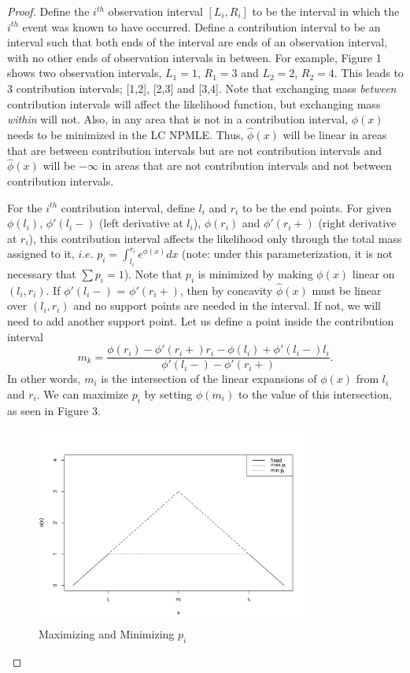 	\begin{proof}

	Define the $i^{th}$ observation interval $[L_i, R_i]$ to be the interval in which the $i^{th}$ event was known to have occurred. Define a contribution interval to be an interval such that both ends of the interval are ends of an observation interval, with no other ends of observation intervals in between. For example, Figure 1 shows two observation intervals, $L_1 = 1$, $R_1 = 3$ and $L_2 = 2$, $R_2 = 4$. This leads to 3 contribution intervals; [1,2], [2,3] and [3,4]. Note that exchanging mass \emph{between} contribution intervals will affect the likelihood function, but exchanging mass \emph{within} will not. Also, in any area that is not in a contribution interval, $\phi(x)$ needs to be minimized in the LC NPMLE. Thus, $\hat \phi(x)$ will be linear in areas that are between contribution intervals but are not contribution intervals and $\hat \phi(x)$ will be $-\infty$ in areas that are not contribution intervals and not between contribution intervals. 

	For the $i^{th}$ contribution interval, define $l_i$ and $r_i$ to be the end points. For given $\phi(l_i)$, $\phi'(l_i -)$ (left derivative at $l_i$), $\phi(r_i)$ and $\phi'(r_i+)$ (right derivative at $r_i$), this contribution interval affects the likelihood only through the total mass assigned to it, $i.e.$ $p_i = \int_{l_i}^{r_i} e^ {\phi(x)} dx$ (note: under this parameterization, it is not necessary that $\sum p_i = 1$). Note that $p_i$ is minimized by making $\phi(x)$ linear on $(l_i, r_i)$. If $\phi'(l_i - )$ = $\phi'(r_i + )$, then by concavity $\hat{\phi}(x)$ must be linear over $(l_i, r_i)$ and no support points are needed in the interval. If not, we will need to add another support point. Let us define a point inside the contribution interval 	
	\[ m_k = \frac{\phi(r_i) - \phi'(r_i + ) r_i - \phi(l_i) + \phi'(l_i - ) l_i} { \phi'(l_i - ) - \phi'(r_i + )}.
	\]		
	In other words, $m_i$ is the intersection of the linear expansions of $\phi(x)$ from $l_i$ and $r_i$. We can maximize $p_i$ by setting $\phi(m_i)$ to the value of this intersection, as seen in Figure 3. 

	\begin{figure}[h]
\centerline{\includegraphics[width = 9cm]{maxminpk.pdf}}
\caption{Maximizing and Minimizing $p_i$}
\end{figure}		


\end{proof}
